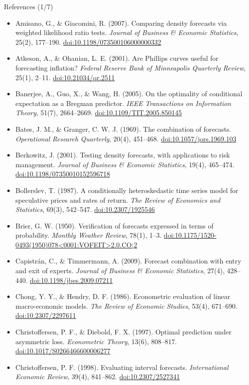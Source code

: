 \begin{frame}{References (1/7)}
\itemsize{\tiny}
\begin{itemize}
    \item Amisano, G., \& Giacomini, R. (2007). Comparing density forecasts via weighted likelihood ratio tests. \textit{Journal of Business \& Economic Statistics}, 25(2), 177--190. \href{https://doi.org/10.1198/073500106000000332}{doi:10.1198/073500106000000332}
    \item Atkeson, A., \& Ohanian, L. E. (2001). Are Phillips curves useful for forecasting inflation? \textit{Federal Reserve Bank of Minneapolis Quarterly Review}, 25(1), 2--11. \href{https://doi.org/10.21034/qr.2511}{doi:10.21034/qr.2511}
    \item Banerjee, A., Guo, X., \& Wang, H. (2005). On the optimality of conditional expectation as a Bregman predictor. \textit{IEEE Transactions on Information Theory}, 51(7), 2664--2669. \href{https://doi.org/10.1109/TIT.2005.850145}{doi:10.1109/TIT.2005.850145}
    \item Bates, J. M., \& Granger, C. W. J. (1969). The combination of forecasts. \textit{Operational Research Quarterly}, 20(4), 451--468. \href{https://doi.org/10.1057/jors.1969.103}{doi:10.1057/jors.1969.103}
    \item Berkowitz, J. (2001). Testing density forecasts, with applications to risk management. \textit{Journal of Business \& Economic Statistics}, 19(4), 465--474. \href{https://doi.org/10.1198/07350010152596718}{doi:10.1198/07350010152596718}
    \item Bollerslev, T. (1987). A conditionally heteroskedastic time series model for speculative prices and rates of return. \textit{The Review of Economics and Statistics}, 69(3), 542--547. \href{https://doi.org/10.2307/1925546}{doi:10.2307/1925546}
    \item Brier, G. W. (1950). Verification of forecasts expressed in terms of probability. \textit{Monthly Weather Review}, 78(1), 1--3. \href{https://doi.org/10.1175/1520-0493(1950)078\%3C0001:VOFEIT\%3E2.0.CO;2}{doi:10.1175/1520-0493(1950)078\textless{}0001:VOFEIT\textgreater{}2.0.CO;2}
    \item Capistrán, C., \& Timmermann, A. (2009). Forecast combination with entry and exit of experts. \textit{Journal of Business \& Economic Statistics}, 27(4), 428--440. \href{https://doi.org/10.1198/jbes.2009.07211}{doi:10.1198/jbes.2009.07211}
    \item Chong, Y. Y., \& Hendry, D. F. (1986). Econometric evaluation of linear macro-economic models. \textit{The Review of Economic Studies}, 53(4), 671--690. \href{https://doi.org/10.2307/2297611}{doi:10.2307/2297611}
    \item Christoffersen, P. F., \& Diebold, F. X. (1997). Optimal prediction under asymmetric loss. \textit{Econometric Theory}, 13(6), 808--817. \href{https://doi.org/10.1017/S0266466600006277}{doi:10.1017/S0266466600006277}
    \item Christoffersen, P. F. (1998). Evaluating interval forecasts. \textit{International Economic Review}, 39(4), 841--862. \href{https://doi.org/10.2307/2527341}{doi:10.2307/2527341}
\end{itemize}
\end{frame}

